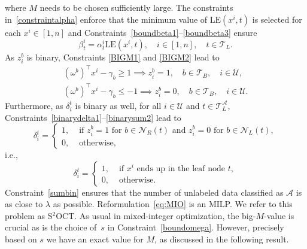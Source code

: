 \documentclass[a4paper,american,reqno]{amsart}
\newcommand{\LE}{\text{LE}}
\begin{document}
\endgroup
where $M$ needs to be chosen sufficiently large.
The constraints in~\eqref{constraintalpha} enforce that the minimum
value of $\LE(x^i,t)$ is selected for each $x^i \in [1,n]$ and
Constraints~\eqref{boundbeta1}--\eqref{boundbeta3} ensure
\begin{equation*}
  \beta^i_t = \alpha^i_t \LE(x^i,t),
  \quad i \in [1,n], \quad t \in \mathcal{T}_L.
\end{equation*}
As $z^b_i$ is binary, Constraints \eqref{BIGM1} and \eqref{BIGM2} lead
to
\begin{align*}
  (\omega^b)^\top x^i - \gamma_b \geq 1 \implies z^b_i = 1, \quad b
  \in   \mathcal{T}_B, \quad i \in \mathcal{U},
  \\
  (\omega^b)^\top x^i - \gamma_b \leq -1 \implies z^b_i   = 0, \quad b
  \in   \mathcal{T}_B, \quad i \in \mathcal{U}.
\end{align*}
Furthermore, as $\delta_i^t$ is binary as well, for all $i \in
\mathcal{U}$ and $t \in \mathcal{T}_L^{\mathcal{A}}$,
Constraints~\eqref{binarydelta1}--\eqref{binarysum2} lead to
\begin{equation*}
  \delta_i^t =
  \begin{cases}
    1, & \text{ if }  z_i^b = 1 \text{ for } b \in \mathcal{N}_R(t)
    \text{ and } z_i^b = 0 \text{ for } b \in \mathcal{N}_L(t),
    \\
    0, & \text{ otherwise},
  \end{cases}
\end{equation*}
i.e.,
\begin{equation*}
  \delta_i^t =
  \begin{cases}
    1, & \text{ if }  x^i \text{ ends up in the leaf node } t,
    \\
    0, & \text{ otherwise}.
  \end{cases}
\end{equation*}
%
Constraint~\eqref{sumbin} ensures that the number of unlabeled data
classified as $\mathcal{A}$ is as close to $\lambda$ as possible.
Reformulation~\eqref{eq:MIO} is an MILP.
We refer to this problem as S$^2$OCT.
As usual in mixed-integer optimization, the big-$M$-value
is crucial as is the choice of~$s$ in Constraint~\eqref{boundomega}.
However, precisely based on $s$ we have an exact value for $M$, as
discussed in the following result.
\end{document}
